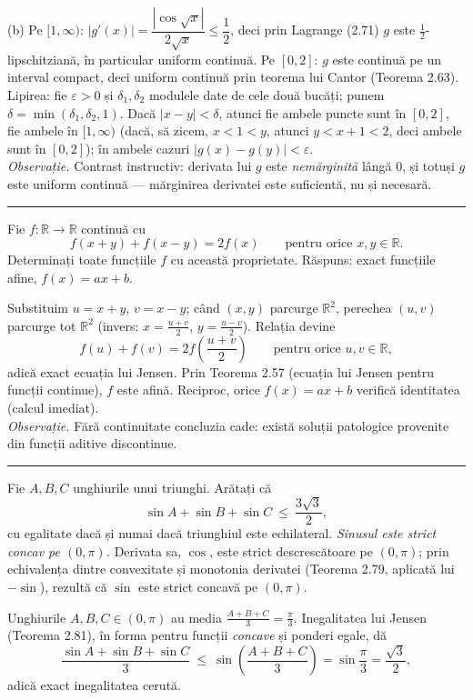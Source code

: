 (b) Pe $[1,\infty)$: $|g'(x)|=\dfrac{|\cos\sqrt x|}{2\sqrt x}\le\dfrac12$, deci prin Lagrange (2.71) $g$ este $\tfrac12$-lipschitziană, în particular uniform continuă. Pe $[0,2]$: $g$ este continuă pe un interval compact, deci uniform continuă prin teorema lui Cantor (Teorema 2.63). Lipirea: fie $\varepsilon>0$ și $\delta_1,\delta_2$ modulele date de cele două bucăți; punem $\delta=\min(\delta_1,\delta_2,1)$. Dacă $|x-y|<\delta$, atunci fie ambele puncte sunt în $[0,2]$, fie ambele în $[1,\infty)$ (dacă, să zicem, $x<1<y$, atunci $y<x+1<2$, deci ambele sunt în $[0,2]$); în ambele cazuri $|g(x)-g(y)|<\varepsilon$.\\[2pt]
\emph{Observație.} Contrast instructiv: derivata lui $g$ este \emph{nemărginită} lângă $0$, și totuși $g$ este uniform continuă --- mărginirea derivatei este suficientă, nu și necesară.
\vspace{1mm}\hrule

Fie $f:\mathbb{R}\to\mathbb{R}$ continuă cu
\[ f(x+y)+f(x-y)=2f(x)\qquad\text{pentru orice }x,y\in\mathbb{R}. \]
Determinați toate funcțiile $f$ cu această proprietate.
\sol Răspuns: exact funcțiile afine, $f(x)=ax+b$.

Substituim $u=x+y$, $v=x-y$; când $(x,y)$ parcurge $\mathbb{R}^2$, perechea $(u,v)$ parcurge tot $\mathbb{R}^2$ (invers: $x=\frac{u+v}2$, $y=\frac{u-v}2$). Relația devine
\[ f(u)+f(v)=2f\!\left(\frac{u+v}{2}\right)\qquad\text{pentru orice }u,v\in\mathbb{R}, \]
adică exact ecuația lui Jensen. Prin Teorema 2.57 (ecuația lui Jensen pentru funcții continue), $f$ este afină. Reciproc, orice $f(x)=ax+b$ verifică identitatea (calcul imediat).\\[2pt]
\emph{Observație.} Fără continuitate concluzia cade: există soluții patologice provenite din funcții aditive discontinue.
\vspace{1mm}\hrule

Fie $A,B,C$ unghiurile unui triunghi. Arătați că
\[ \sin A+\sin B+\sin C\ \le\ \frac{3\sqrt3}{2} , \]
cu egalitate dacă și numai dacă triunghiul este echilateral.
\sol \emph{Sinusul este strict concav pe $(0,\pi)$.} Derivata sa, $\cos$, este strict descrescătoare pe $(0,\pi)$; prin echivalența dintre convexitate și monotonia derivatei (Teorema 2.79, aplicată lui $-\sin$), rezultă că $\sin$ este strict concavă pe $(0,\pi)$.

Unghiurile $A,B,C\in(0,\pi)$ au media $\frac{A+B+C}{3}=\frac\pi3$. Inegalitatea lui Jensen (Teorema 2.81), în forma pentru funcții \emph{concave} și ponderi egale, dă
\[ \frac{\sin A+\sin B+\sin C}{3}\ \le\ \sin\!\left(\frac{A+B+C}{3}\right)=\sin\frac\pi3=\frac{\sqrt3}{2} , \]
adică exact inegalitatea cerută.

